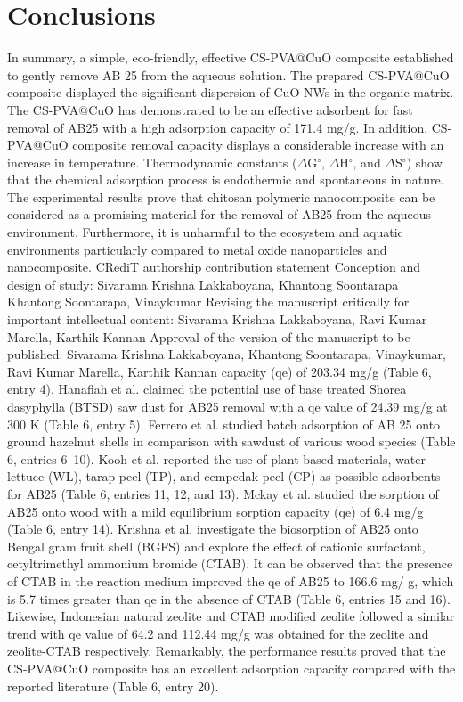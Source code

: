 \documentclass[final,5p,times,twocolumn,authoryear]{elsarticle}
\begin{document}
\section{Conclusions}
In summary, a simple, eco-friendly, effective CS-PVA@CuO composite established to gently remove AB 25 from the aqueous solution. The prepared CS-PVA@CuO composite displayed the significant dispersion of CuO NWs in the organic matrix. The CS-PVA@CuO has demonstrated to be an effective adsorbent for fast removal of AB25 with a high adsorption capacity of 171.4 mg/g. In addition, CS-PVA@CuO composite removal capacity displays a considerable increase with an increase in temperature. Thermodynamic constants ($\Delta$G$^\circ$, $\Delta$H$^\circ$, and $\Delta$S$^\circ$) show that the chemical adsorption process is endothermic and spontaneous in nature. The experimental results prove that chitosan polymeric nanocomposite can be considered as a promising material for the removal of AB25 from the aqueous environment. Furthermore, it is unharmful to the ecosystem and aquatic environments particularly compared to metal oxide nanoparticles and nanocomposite.
CRediT authorship contribution statement
Conception and design of study: Sivarama Krishna Lakkaboyana,
Khantong Soontarapa
Khantong Soontarapa, Vinaykumar
Revising the manuscript critically for important intellectual content:
Sivarama Krishna Lakkaboyana, Ravi Kumar Marella, Karthik Kannan
Approval of the version of the manuscript to be published:
Sivarama Krishna Lakkaboyana, Khantong Soontarapa, Vinaykumar, Ravi Kumar Marella, Karthik Kannan 
capacity (qe) of 203.34 mg/g (Table 6, entry 4). Hanaﬁah et al. claimed the potential use of base treated Shorea dasyphylla (BTSD) saw dust for AB25 removal with a qe value of 24.39 mg/g at 300 K (Table 6, entry 5). Ferrero et al. studied batch adsorption of AB 25 onto ground hazelnut shells in comparison with sawdust of various wood species (Table 6, entries 6–10). Kooh et al. reported the use of plant-based materials, water lettuce (WL), tarap peel (TP), and cempedak peel (CP) as possible adsorbents for AB25 (Table 6, entries 11, 12, and 13). Mckay et al. studied the sorption of AB25 onto wood with a mild equilibrium sorption capacity (qe) of 6.4 mg/g (Table 6, entry 14). Krishna et al. investigate the biosorption of AB25 onto Bengal gram fruit shell (BGFS) and explore the effect of cationic surfactant, cetyltrimethyl ammonium bromide (CTAB). It can be observed that the presence of CTAB in the reaction medium improved the qe of AB25 to 166.6 mg/ g, which is 5.7 times greater than qe in the absence of CTAB (Table 6, entries 15 and 16). Likewise, Indonesian natural zeolite and CTAB modified zeolite followed a similar trend with qe value of 64.2 and 112.44 mg/g was obtained for the zeolite and zeolite-CTAB respectively.
Remarkably, the performance results proved that the CS-PVA@CuO composite has an excellent adsorption capacity compared with the reported literature (Table 6, entry 20).
\end{document}
